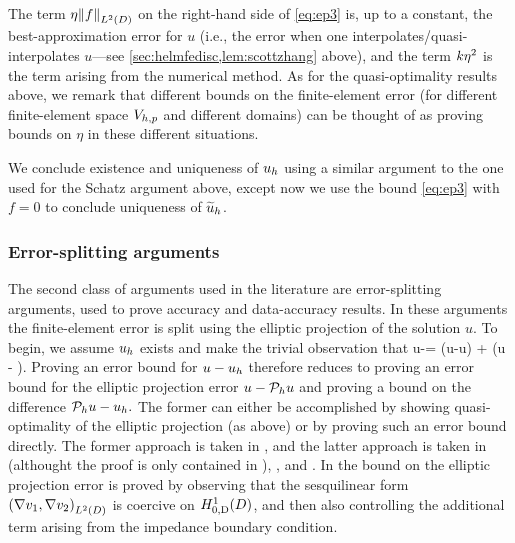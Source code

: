 The term $\wba\NLtD{f}$ on the right-hand side of \cref{eq:ep3} is, up to a constant, the best-approximation error for $u$ (i.e., the error when one interpolates/quasi-interpolates $u$---see \cref{sec:helmfedisc,lem:scottzhang} above), and the term $k\eta^2$ is the  term arising from the numerical method. As for the quasi-optimality results above, we remark that different bounds on the finite-element error (for different finite-element space $V_{h,p}$ and different domains) can be thought of as proving bounds on $\eta$ in these different situations.

We conclude existence and uniqueness of $u_{h}$ using a similar argument to the one used for the Schatz argument above, except now we use the bound \cref{eq:ep3} with $f = 0$ to conclude uniqueness of $\widetilde{u}_{h}$.
\subsubsection{Error-splitting arguments}\label{sec:errorsplit}
The second class of arguments used in the literature are error-splitting arguments, used to prove accuracy and data-accuracy results. In these arguments the finite-element error is split using the elliptic projection of the solution $u$. To begin, we assume $u_{h}$ exists and make the trivial observation that
\beqs\label{eq:split1}
u-\uh = \mleft(u-\Ph u\mright) + \mleft(\Ph u - \uh\mright).
\eeqs
Proving an error bound for $u-u_{h}$ therefore reduces to proving an error bound for the elliptic projection error $u- \mathcal P_{h} u$ and proving a bound on the difference $\mathcal P_{h} u - u_{h}.$ The former can either be accomplished by showing quasi-optimality of the elliptic projection (as above) or by proving such an error bound directly. The former approach is taken in \cite{DuWu:15,ChGaNiTo:18,LiWu:19}, and the latter approach is taken in \cite[Lemma 5.2]{FeWu:09} (althought the proof is only contained in \cite[Lemma 5.2]{FeWu:08}), \cite[Lemma 4.3]{FeWu:11}, and \cite[Lemma 4.2]{Wu:14}. In \cite{FeWu:09,FeWu:11,Wu:14} the bound on the elliptic projection error is proved by observing that the sesquilinear form $\IPLtD{\grad \vo}{\grad \vt}$ is coercive on $\HozDD$, and then also controlling the additional term arising from the impedance boundary condition.

